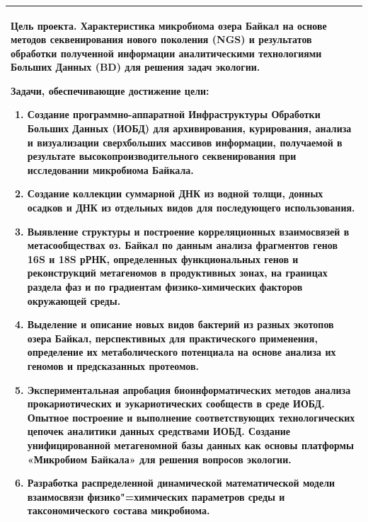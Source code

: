 \documentclass[a4paper,12pt,openany,final]{extreport}
\begin{document}
\begin{longtable}[]{@{}l@{}}
\toprule
\begin{minipage}[t]{0.97\columnwidth}
\textbf{Цель проекта}. Характеристика микробиома озера Байкал на основе
методов секвенирования нового поколения (NGS) и результатов обработки
полученной информации аналитическими технологиями Больших Данных (BD)
для решения задач экологии.

\textbf{Задачи, обеспечивающие достижение цели}:
\begin{enumerate}
\item Создание программно-аппаратной Инфраструктуры Обработки
  Больших Данных (ИОБД) для архивирования, курирования, анализа и
  визуализации сверхбольших массивов информации, получаемой в
  результате высокопроизводительного секвенирования при исследовании
  микробиома Байкала.

\item  Создание коллекции суммарной ДНК из водной толщи, донных осадков и
ДНК из отдельных видов для последующего использования.

\item  Выявление структуры и построение корреляционных взаимосвязей в
метасообществах оз. Байкал по данным анализа фрагментов генов 16S и 18S
рРНК, определенных функциональных генов и реконструкций метагеномов в
продуктивных зонах, на границах раздела фаз и по градиентам
физико-химических факторов окружающей среды.

\item  Выделение и описание новых видов бактерий из разных экотопов озера
Байкал, перспективных для практического применения, определение их
метаболического потенциала на основе анализа их геномов и предсказанных
протеомов.

\item  Экспериментальная апробация биоинформатических методов анализа
прокариотических и эукариотических сообществ в среде ИОБД. Опытное
построение и выполнение соответствующих технологических цепочек
аналитики данных средствами ИОБД. Создание унифицированной метагеномной
базы данных как основы платформы «Микробиом Байкала» для решения
вопросов экологии.

\item Разработка распределенной динамической математической модели взаимосвязи физико"=химических параметров среды и таксономического состава микробиома.\strut
\end{enumerate}
\end{minipage}\tabularnewline
\bottomrule
\end{longtable}
\clearpage{}
\end{document}
